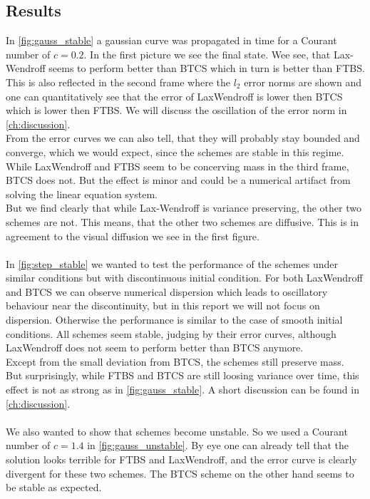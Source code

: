 \subsection{Results}
In \cref{fig:gauss_stable} a gaussian curve was propagated in time for a Courant number of $c=0.2$. In the first picture we see the final state. Wee see, that Lax-Wendroff seems to perform better than BTCS which in turn is better than FTBS. This is also reflected in the second frame where the  $l_2$ error norms are shown and one can quantitatively see that the error of LaxWendroff is lower then BTCS which is lower then FTBS. We will discuss the oscillation of the error norm in \cref{ch:discussion}. \\
From the error curves we can also tell, that they will probably stay bounded and converge, which we would expect, since the schemes are stable in this regime. \\
While LaxWendroff and FTBS seem to be concerving mass in the third frame, BTCS does not. But the effect is minor and could be a numerical artifact from solving the linear equation system. \\
But we find clearly that while Lax-Wendroff is variance preserving, the other two schemes are not. This means, that the other two schemes are diffusive. This is in agreement to the visual diffusion we see in the first figure.\\ \\
In \cref{fig:step_stable} we wanted to test the performance of the schemes under similar conditions but with discontinuous initial condition. For both LaxWendroff and BTCS we can observe numerical dispersion which leads to oscillatory behaviour near the discontinuity, but in this report we will not focus on dispersion. Otherwise the performance is similar to the case of smooth initial conditions. All schemes seem stable, judging by their error curves, although LaxWendroff does not seem to perform better than BTCS anymore.\\
Except from the small deviation from BTCS, the schemes still preserve mass. \\
But surprisingly, while FTBS and BTCS are still loosing variance over time, this effect is not as strong as in \cref{fig:gauss_stable}. A short discussion can be found in \cref{ch:discussion}. \\ \\
We also wanted to show that schemes become unstable. So we used a Courant number of $c=1.4$ in \cref{fig:gauss_unstable}. By eye one can already tell that the solution looks terrible for FTBS and LaxWendroff, and the error curve is clearly divergent for these two schemes. The BTCS scheme on the other hand seems to be stable as expected.\\
